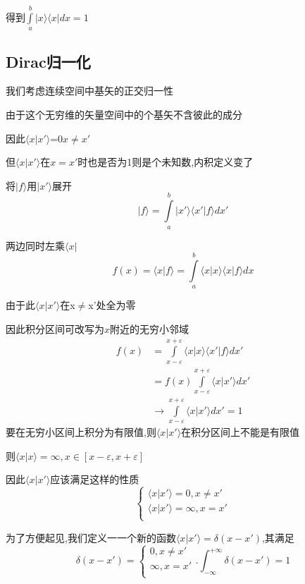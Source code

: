 \documentclass[lang=cn,10pt]{elegantbook}
\begin{document}
得到$\int\limits_a^b{| x\rangle \langle x| dx}=1	$
\subsection{Dirac归一化}

我们考虑连续空间中基矢的正交归一性

由于这个无穷维的矢量空间中的个基矢不含彼此的成分

因此$\langle x|x'\rangle$=0$x\ne x'$

但$\langle x|x'\rangle$在$x=x'$时也是否为1则是个未知数,内积定义变了

将$|f\rangle$用$|x'\rangle$展开
\begin{equation*}
	|f\rangle =\int\limits_a^b{|x'\rangle \langle x'|f\rangle dx'}
\end{equation*}

两边同时左乘$\langle x|$
\begin{equation*}
	f(x)=\langle x|f\rangle =\int\limits_a^b{\langle x|x\rangle \langle x|f\rangle dx}
\end{equation*}

由于此$\langle x|x'\rangle$在x$\ne$x'处全为零

因此积分区间可改写为$ x$附近的无穷小邻域
\begin{equation*}
	\begin{split}
		f\left( x \right) &=\int\limits_{x-\varepsilon}^{x+\varepsilon}{\langle x|x\rangle \langle x'|f\rangle dx'}
		\\
		&=f\left( x \right) \int\limits_{x-\varepsilon}^{x+\varepsilon}{\langle x|x'\rangle dx'}
		\\
		&\rightarrow \int\limits_{x-\varepsilon}^{x+\varepsilon}{\langle x|x'\rangle dx'}=1
	\end{split}
\end{equation*}
要在无穷小区间上积分为有限值,则$\langle x|x'\rangle$在积分区间上不能是有限值

则$\langle x|x\rangle=\infty,x\in[x-\varepsilon,x+\varepsilon]$

因此$\langle x|x'\rangle$应该满足这样的性质
\begin{equation*}
	\begin{cases}
		\langle x|x'\rangle =0,x\ne x'\\
		\langle x|x'\rangle =\infty ,x=x'\\
	\end{cases}
\end{equation*}

为了方便起见,我们定义一一个新的函数$\langle x|x'\rangle=\delta(x-x') $,其满足
\begin{equation*}
	\delta \left( x-x' \right) =\begin{cases}
		0,x\ne x'\\
		\infty ,x=x'\\
	\end{cases}.\int_{-\infty}^{+\infty}{\delta \left( x-x' \right)}=1
\end{equation*}
 
\end{document}
